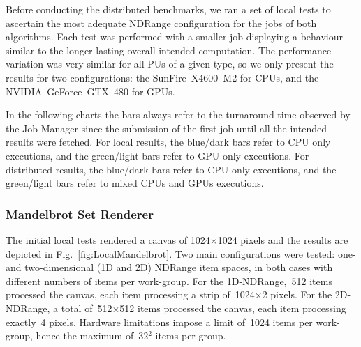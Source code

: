 \documentclass[runningheads,a4paper]{llncs}
\begin{document}

Before conducting the distributed benchmarks, we ran a set of local tests to ascertain the most adequate NDRange configuration for the jobs of both algorithms. Each test was performed with a smaller job displaying a behaviour similar to the longer-lasting overall intended computation. The performance variation was very similar for all PUs of a given type, so we only present the results for two configurations: the SunFire~X4600~M2 for CPUs, and the NVIDIA~GeForce~GTX~480 for GPUs.

In the following charts the bars always refer to the turnaround time observed by the Job Manager since the submission of the first job until all the intended results were fetched. For local results, the blue/dark bars refer to CPU only executions, and the green/light bars refer to GPU only executions. For distributed results, the blue/dark bars refer to CPU only executions, and the green/light bars refer to mixed CPUs and GPUs executions.



%
\subsubsection{Mandelbrot Set Renderer}
\label{subsub:mandelbrot}


The initial local tests rendered a canvas of 1024$\times$1024 pixels and the results are depicted in Fig.~\ref{fig:LocalMandelbrot}. Two main configurations were tested: one- and two-dimensional (1D and 2D) NDRange item spaces, in both cases with different numbers of items per work-group. For the 1D-NDRange,~512 items processed the canvas, each item processing a strip of~1024$\times$2 pixels. For the 2D-NDRange, a total of~512$\times$512 items processed the canvas, each item processing exactly~4 pixels. Hardware limitations impose a limit of~1024 items per work-group, hence the maximum of~32$^2$ items per group.

\end{document}
